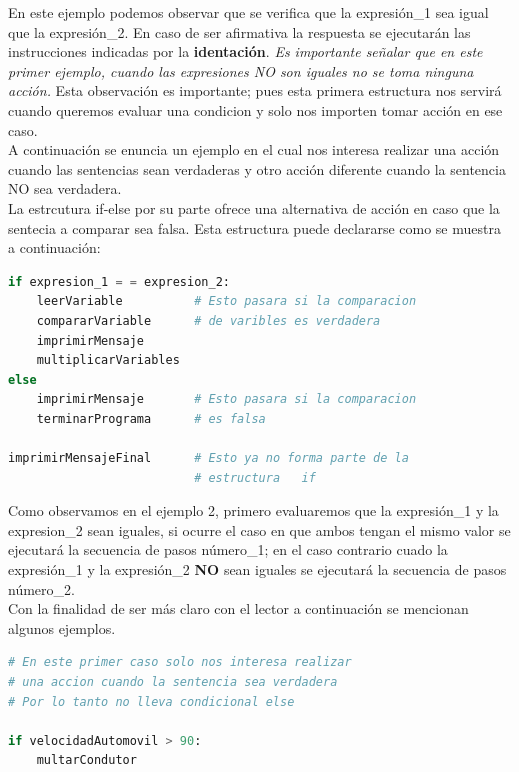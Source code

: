 \documentclass[a4paper, openright, 12pt]{article}
\begin{document}
    En este ejemplo podemos observar que se verifica que la expresión\_1 sea igual que la expresión\_2. En caso de ser afirmativa la respuesta se ejecutarán las instrucciones indicadas por la \textbf{identación}. \textit{Es importante señalar que en este primer ejemplo, cuando las expresiones NO son iguales no se toma ninguna acción.} Esta observación es importante; pues esta primera estructura nos servirá cuando queremos evaluar una condicion y solo nos importen tomar acción en ese caso.\\

    A continuación se enuncia un ejemplo en el cual nos interesa realizar una acción cuando las sentencias sean verdaderas y otro acción diferente cuando la sentencia NO sea verdadera.\\


    La estrcutura if-else por su parte ofrece una alternativa de acción en caso que la sentecia a comparar sea falsa. Esta estructura puede declararse como se muestra a continuación:\\

\begin{lstlisting}[language=Python]
if expresion_1 = = expresion_2:
    leerVariable          # Esto pasara si la comparacion
    compararVariable      # de varibles es verdadera
    imprimirMensaje
    multiplicarVariables
else
    imprimirMensaje       # Esto pasara si la comparacion
    terminarPrograma      # es falsa

imprimirMensajeFinal      # Esto ya no forma parte de la
                          # estructura   if
\end{lstlisting}


    Como observamos en el ejemplo 2, primero evaluaremos que la expresión\_1 y la expresion\_2 sean iguales, si ocurre el caso en que ambos tengan el mismo valor se ejecutará la secuencia de pasos número\_1; en el caso contrario cuado la expresión\_1 y la expresión\_2 \textbf{NO} sean iguales se ejecutará la secuencia de pasos número\_2.\\

    Con la finalidad de ser más claro con el lector a continuación se mencionan algunos ejemplos.\\

\begin{lstlisting}[language=Python]
# En este primer caso solo nos interesa realizar
# una accion cuando la sentencia sea verdadera
# Por lo tanto no lleva condicional else

if velocidadAutomovil > 90:
    multarCondutor          
\end{lstlisting}
  
\end{document}
